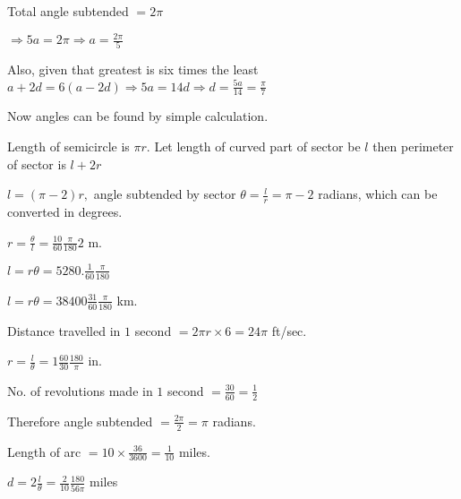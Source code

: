     Total angle subtended $= 2\pi$

    $\Rightarrow 5a = 2\pi \Rightarrow a = \frac{2\pi}{5}$

    Also, given that greatest is six times the least $a + 2d = 6(a - 2d) \Rightarrow 5a = 14d \Rightarrow d = \frac{5a}{14} =
    \frac{\pi}{7}$

    Now angles can be found by simple calculation.

\item Length of semicircle is $\pi r$. Let length of curved part of sector be $l$ then perimeter of sector is $l +
    2r$

    $l = (\pi - 2)r,$ angle subtended by sector $\theta = \frac{l}{r} = \pi - 2$ radians, which can be converted in
    degrees.

\item $r = \frac{\theta}{l} = \frac{10}{60}\frac{\pi}{180}2$ m.

\item $l = r\theta = 5280.\frac{1}{60}\frac{\pi}{180}$

\item $l = r\theta = 38400\frac{31}{60}\frac{\pi}{180}$ km.

\item Distance travelled in $1$ second $= 2\pi r \times 6 = 24\pi$ ft/sec.

\item $r = \frac{l}{\theta} = 1\frac{60}{30}\frac{180}{\pi}$ in.

\item No. of revolutions made in $1$ second $= \frac{30}{60} = \frac{1}{2}$

    Therefore angle subtended $= \frac{2\pi}{2} = \pi$ radians.

\item Length of arc $= 10 \times \frac{36}{3600} = \frac{1}{10}$ miles.

    $d = 2\frac{l}{\theta} = \frac{2}{10}\frac{180}{56\pi}$ miles
\stopitemize
